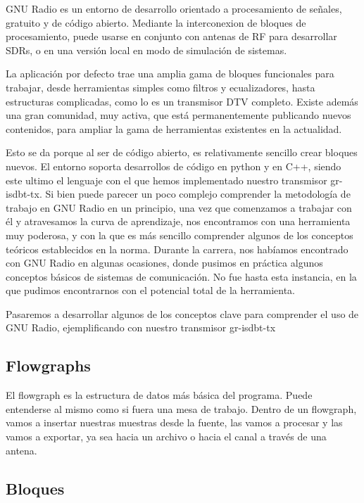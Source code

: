 GNU Radio es un entorno de desarrollo orientado a procesamiento de señales, gratuito y de código abierto. Mediante la interconexion de bloques de procesamiento, puede usarse en conjunto con antenas de RF para desarrollar SDRs, o en una versión local en modo de simulación de sistemas.
 
La aplicación por defecto trae una amplia gama de bloques funcionales para trabajar, desde herramientas simples como filtros y ecualizadores, hasta estructuras complicadas, como lo es un transmisor DTV completo.  Existe además una gran comunidad, muy activa, que está permanentemente publicando nuevos contenidos, para ampliar la gama de herramientas existentes en la actualidad. 

Esto se da porque al ser de código abierto, es relativamente sencillo crear bloques nuevos. El entorno soporta desarrollos de código en python y en C++, siendo este ultimo el lenguaje con el que hemos implementado nuestro transmisor gr-isdbt-tx. Si bien puede parecer un poco complejo comprender la metodología de trabajo en GNU Radio en un principio,  una vez que comenzamos a trabajar con él y atravesamos la curva de aprendizaje, nos encontramos con una herramienta muy poderosa, y con la que es más sencillo comprender algunos de los conceptos teóricos establecidos en la norma.
Durante la carrera, nos habíamos encontrado con GNU Radio en algunas ocasiones, donde pusimos en práctica algunos conceptos básicos de sistemas de comunicación. No fue hasta esta instancia, en la que pudimos encontrarnos con el potencial total de la herramienta. 

Pasaremos a desarrollar algunos de los conceptos clave para comprender el uso de GNU Radio, ejemplificando con nuestro transmisor gr-isdbt-tx

\subsection{Flowgraphs}

El flowgraph es la estructura de datos más básica del programa. Puede entenderse al mismo como si fuera una mesa de trabajo. Dentro de un flowgraph, vamos a insertar nuestras muestras desde la fuente, las vamos a procesar y las vamos a exportar, ya sea hacia un archivo o hacia el canal a través de una antena. 

\subsection{Bloques}

